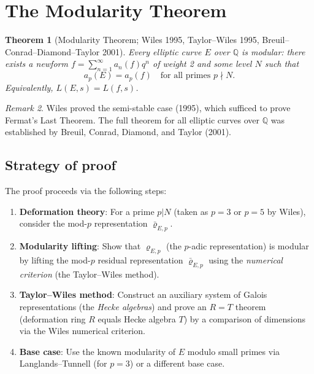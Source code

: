 \documentclass[a4paper,12pt]{amsart}
\newtheorem{theorem}{Theorem}[section]
\theoremstyle{definition}
\theoremstyle{remark}
\newtheorem{remark}[theorem]{Remark}
\newcommand{\Q}{\mathbb{Q}}
\begin{document}
\section{The Modularity Theorem}
\label{sec:modularity}

\begin{theorem}[Modularity Theorem; Wiles 1995, Taylor--Wiles 1995,
  Breuil--Conrad--Diamond--Taylor 2001]
\label{thm:modularity}
Every elliptic curve $E$ over $\Q$ is modular: there exists a newform
$f = \sum_{n=1}^\infty a_n(f) q^n$ of weight 2 and some level $N$ such that
\[
  a_p(E) = a_p(f) \quad \text{for all primes } p \nmid N.
\]
Equivalently, $L(E, s) = L(f, s)$.
\end{theorem}

\begin{remark}
Wiles proved the semi-stable case (1995), which sufficed to prove Fermat's Last
Theorem. The full theorem for all elliptic curves over $\Q$ was established by
Breuil, Conrad, Diamond, and Taylor (2001).
\end{remark}

\subsection{Strategy of proof}

The proof proceeds via the following steps:

\begin{enumerate}[label=(\roman*)]
\item \textbf{Deformation theory}: For a prime $p | N$ (taken as $p = 3$ or $p = 5$
by Wiles), consider the mod-$p$ representation $\bar{\varrho}_{E,p}$.

\item \textbf{Modularity lifting}: Show that $\varrho_{E,p}$ (the $p$-adic
representation) is modular by lifting the mod-$p$ residual representation
$\bar{\varrho}_{E,p}$ using the \emph{numerical criterion} (the Taylor--Wiles method).

\item \textbf{Taylor--Wiles method}: Construct an auxiliary system of Galois
representations (the \emph{Hecke algebras}) and prove an $R = T$ theorem
(deformation ring $R$ equals Hecke algebra $T$) by a comparison of dimensions
via the Wiles numerical criterion.

\item \textbf{Base case}: Use the known modularity of $E$ modulo small primes via
Langlands--Tunnell (for $p = 3$) or a different base case.
\end{enumerate}
\end{document}
